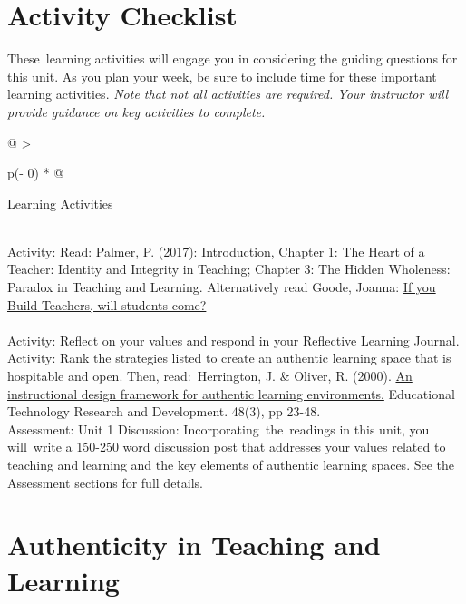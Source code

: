 \documentclass[
]{book}
\begin{document}
\hypertarget{activity-checklist}{%
\section*{Activity Checklist}\label{activity-checklist}}

These~learning activities will engage you in considering the guiding questions for this unit. As you plan your week, be sure to include time for these important learning activities. \emph{Note that not all activities are required. Your instructor will provide guidance on key activities to complete.}

\begin{longtable}[]{@{}
  >{\raggedright\arraybackslash}p{(\columnwidth - 0\tabcolsep) * }@{}}
\toprule
\begin{minipage}[b]{\linewidth}\raggedright
Learning Activities
\end{minipage} \\
\midrule
\endhead
Activity: Read: Palmer, P. (2017): Introduction, Chapter 1: The Heart of a Teacher: Identity and Integrity in Teaching; Chapter 3: The Hidden Wholeness: Paradox in Teaching and Learning. Alternatively read Goode, Joanna: \href{https://journals-sagepub-com.twu.idm.oclc.org/doi/pdf/10.2190/2102-5G77-QL77-5506}{If you Build Teachers, will students come?} \\
 \\
Activity: Reflect on your values and respond in your Reflective Learning Journal. \\
Activity: Rank the strategies listed to create an authentic learning space that is hospitable and open. Then, read:~Herrington, J. \& Oliver, R. (2000). \href{https://ro.uow.edu.au/edupapers/31/}{An instructional design framework for authentic learning environments.} Educational Technology Research and Development. 48(3), pp 23-48. \\
Assessment: Unit 1 Discussion: Incorporating~the~readings in this unit, you will~write a 150-250 word discussion post that addresses your values related to teaching and learning and the key elements of authentic learning spaces. See the Assessment sections for full details. \\
\bottomrule
\end{longtable}

\hypertarget{authenticity-in-teaching-and-learning}{%
\section{Authenticity in Teaching and Learning}\label{authenticity-in-teaching-and-learning}}
\end{document}
